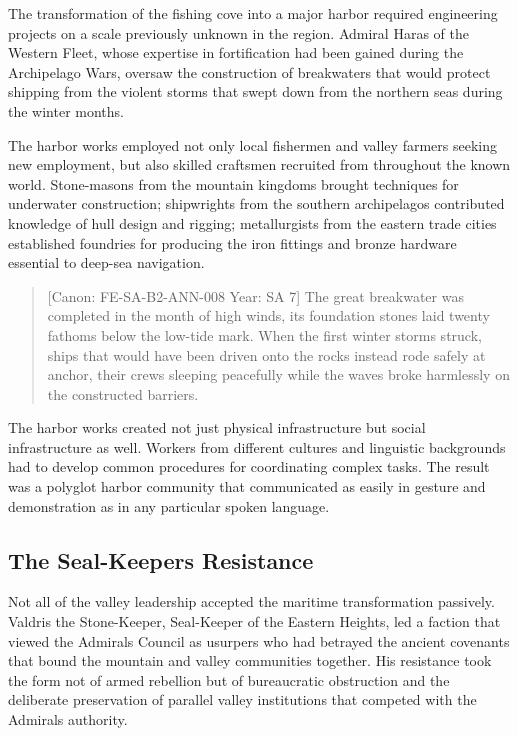 The transformation of the fishing cove into a major harbor required
engineering projects on a scale previously unknown in the region.
Admiral Haras of the Western Fleet, whose expertise in fortification had
been gained during the Archipelago Wars, oversaw the construction of
breakwaters that would protect shipping from the violent storms that
swept down from the northern seas during the winter months.

The harbor works employed not only local fishermen and valley farmers
seeking new employment, but also skilled craftsmen recruited from
throughout the known world. Stone-masons from the mountain kingdoms
brought techniques for underwater construction; shipwrights from the
southern archipelagos contributed knowledge of hull design and rigging;
metallurgists from the eastern trade cities established foundries for
producing the iron fittings and bronze hardware essential to deep-sea
navigation.

\begin{quote}
{[}Canon: FE-SA-B2-ANN-008 \textbar{} Year: SA 7{]} The great breakwater
was completed in the month of high winds, its foundation stones laid
twenty fathoms below the low-tide mark. When the first winter storms
struck, ships that would have been driven onto the rocks instead rode
safely at anchor, their crews sleeping peacefully while the waves broke
harmlessly on the constructed barriers.
\end{quote}

The harbor works created not just physical infrastructure but social
infrastructure as well. Workers from different cultures and linguistic
backgrounds had to develop common procedures for coordinating complex
tasks. The result was a polyglot harbor community that communicated as
easily in gesture and demonstration as in any particular spoken
language.

\subsection{The Seal-Keeper\textquotesingle s
Resistance}\label{the-seal-keepers-resistance}

Not all of the valley leadership accepted the maritime transformation
passively. Valdris the Stone-Keeper, Seal-Keeper of the Eastern Heights,
led a faction that viewed the Admiral\textquotesingle s Council as
usurpers who had betrayed the ancient covenants that bound the mountain
and valley communities together. His resistance took the form not of
armed rebellion but of bureaucratic obstruction and the deliberate
preservation of parallel valley institutions that competed with the
Admiral\textquotesingle s authority.

